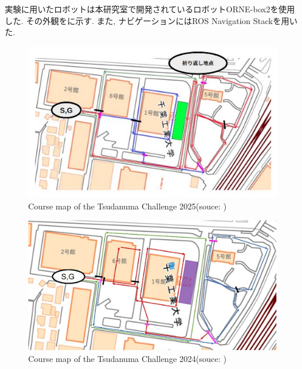 実験に用いたロボットは本研究室で開発されているロボットORNE-box2\cite{井口颯人2023屋外自律移動ロボットプラットフォーム-orne}を使用した. 
その外観をに示す. 
また, ナビゲーションにはROS Navigation Stackを用いた. 
\begin{figure}[hbtp]
  \centering
 \includegraphics[keepaspectratio, scale=0.5]
      {images/2025tsudacha.png}
 \caption{Course map of the Tsudanuma Challenge 2025(souce: \cite{tsudachare})}
 \label{Fig:Course map of the Tsudanuma Challenge 2025}
\end{figure}
\begin{figure}[hbtp]
  \centering
 \includegraphics[keepaspectratio, scale=0.5]
      {images/2024tsudacha.png}
 \caption{Course map of the Tsudanuma Challenge 2024(souce: \cite{tsudachare})}
 \label{Fig:Course map of the Tsudanuma Challenge 2024}
\end{figure}
